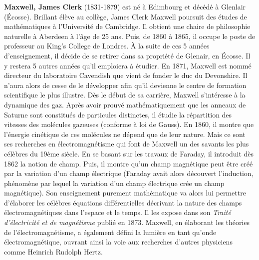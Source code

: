 \textbf{Maxwell, James Clerk} (1831-1879) est né à Edimbourg et décédé à Glenlair (Écosse). Brillant élève au collège, James Clerk Maxwell poursuit des études de mathématiques à l'Université de Cambridge. Il obtient une chaire de philosophie naturelle à Aberdeen à l'âge de 25 ans. Puis, de 1860 à 1865, il occupe le poste de professeur au King's College de Londres. À la suite de ces 5 années d'enseignement, il décide de se retirer dans sa propriété de Glenair, en Écosse. Il y restera 5 autres années qu'il emploiera à étudier. En 1871, Maxwell est nommé directeur du laboratoire Cavendish que vient de fonder le duc du Devonshire. Il n'aura alors de cesse de le développer afin qu'il devienne le centre de formation scientifique le plus illustre. Dès le début de sa carrière, Maxwell s'intéresse à la dynamique des gaz. Après avoir prouvé mathématiquement que les anneaux de Saturne sont constitués de particules distinctes, il étudie la répartition des vitesses des molécules gazeuses (conforme à loi de Gauss). En 1860, il montre que l'énergie cinétique de ces molécules ne dépend que de leur nature. Mais ce sont ses recherches en électromagnétisme qui font de Maxwell un des savants les plus célèbres du 19ème siècle. En se basant sur les travaux de Faraday, il introduit dès 1862 la notion de champ. Puis, il montre qu'un champ magnétique peut être créé par la variation d'un champ électrique (Faraday avait alors découvert l'induction, phénomène par lequel la variation d'un champ électrique crée un champ magnétique). Son enseignement purement mathématique va alors lui permettre d'élaborer les célèbres équations différentielles décrivant la nature des champs électromagnétiques dans l'espace et le temps. Il les expose dans son \textit{Traité d'électricité et de magnétisme} publié en 1873. Maxwell, en élaborant les théories de l'électromagnétisme, a également défini la lumière en tant qu'onde électromagnétique, ouvrant ainsi la voie aux recherches d'autres physiciens comme Heinrich Rudolph Hertz.

